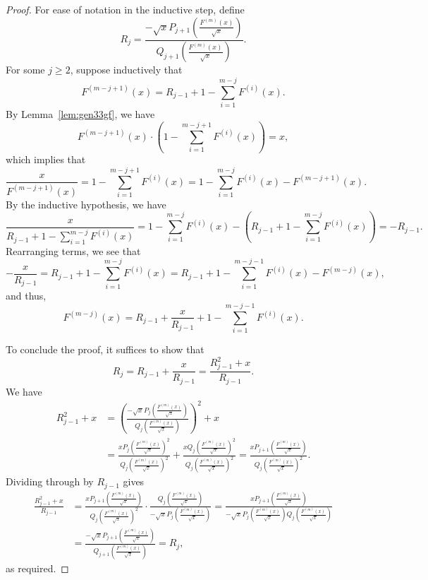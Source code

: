 \documentclass[10pt,a4paper]{amsart}
\newcommand{\gfnoa}[1]{F^{(#1)}(x)}
\begin{document}
\begin{proof}
    For ease of notation in the inductive step, define
    \[
    R_j=\frac{-\sqrt{x}P_{j+1}\!\left(\frac{\gfnoa{m}}{\sqrt{x}}\right)}{Q_{j+1}\!\left(\frac{\gfnoa{m}}{\sqrt{x}}\right)}.
    \]
    For some $j\geq2$, suppose inductively that
    \[
    \gfnoa{m-j+1}=R_{j-1}+1-\sum_{i=1}^{m-j}\gfnoa{i}.
    \]
    By Lemma~\ref{lem:gen33gf}, we have
    \[
    \gfnoa{m-j+1}\cdot\left(1-\sum_{i=1}^{m-j+1}\gfnoa{i}\right)=x,
    \]
    which implies that
    \[
    \frac{x}{\gfnoa{m-j+1}}=1-\sum_{i=1}^{m-j+1}\gfnoa{i}=1-\sum_{i=1}^{m-j}\gfnoa{i}-\gfnoa{m-j+1}.
    \]
    By the inductive hypothesis, we have
    \[
    \frac{x}{R_{j-1}+1-\sum_{i=1}^{m-j}\gfnoa{i}}=1-\sum_{i=1}^{m-j}\gfnoa{i}-\left(R_{j-1}+1-\sum_{i=1}^{m-j}\gfnoa{i}\right)=-R_{j-1}.
    \]
    Rearranging terms, we see that
    \[
    -\frac{x}{R_{j-1}}=R_{j-1}+1-\sum_{i=1}^{m-j}\gfnoa{i}=R_{j-1}+1-\sum_{i=1}^{m-j-1}\gfnoa{i}-\gfnoa{m-j},
    \]
    and thus,
    \[
    \gfnoa{m-j}=R_{j-1}+\frac{x}{R_{j-1}}+1-\sum_{i=1}^{m-j-1}\gfnoa{i}.
    \]

    To conclude the proof, it suffices to show that
    \[
    R_j=R_{j-1}+\frac{x}{R_{j-1}}=\frac{R_{j-1}^2+x}{R_{j-1}}.
    \]
    We have
    \begin{align*}
    R_{j-1}^2+x&=\left(\frac{-\sqrt{x}P_j\!\left(\frac{\gfnoa{m}}{\sqrt{x}}\right)}{Q_{j}\!\left(\frac{\gfnoa{m}}{\sqrt{x}}\right)}\right)^2+x
    \\
    &=\frac{xP_{j}\!\left(\frac{\gfnoa{m}}{\sqrt{x}}\right)^2}{Q_{j}\!\left(\frac{\gfnoa{m}}{\sqrt{x}}\right)^2}+\frac{xQ_{j}\!\left(\frac{\gfnoa{m}}{\sqrt{x}}\right)^2}{Q_{j}\!\left(\frac{\gfnoa{m}}{\sqrt{x}}\right)^2}
    =\frac{xP_{j+1}\left(\frac{\gfnoa{m}}{\sqrt{x}}\right)}{Q_{j}\!\left(\frac{\gfnoa{m}}{\sqrt{x}}\right)^2}.
    \end{align*}
    Dividing through by $R_{j-1}$ gives
    \begin{align*}
        \frac{R_{j-1}^2+x}{R_{j-1}}&=\frac{xP_{j+1}\left(\frac{\gfnoa{m}}{\sqrt{x}}\right)}{Q_{j}\!\left(\frac{\gfnoa{m}}{\sqrt{x}}\right)^2}\cdot\frac{Q_{j}\!\left(\frac{\gfnoa{m}}{\sqrt{x}}\right)}{-\sqrt{x}P_j\!\left(\frac{\gfnoa{m}}{\sqrt{x}}\right)}
        =\frac{xP_{j+1}\left(\frac{\gfnoa{m}}{\sqrt{x}}\right)}{-\sqrt{x}P_{j}\!\left(\frac{\gfnoa{m}}{\sqrt{x}}\right)Q_{j}\!\left(\frac{\gfnoa{m}}{\sqrt{x}}\right)}\\
        &=\frac{-\sqrt{x}P_{j+1}\!\left(\frac{\gfnoa{m}}{\sqrt{x}}\right)}{Q_{j+1}\!\left(\frac{\gfnoa{m}}{\sqrt{x}}\right)}
        =R_j,
    \end{align*}
    as required.
\end{proof}
\end{document}

